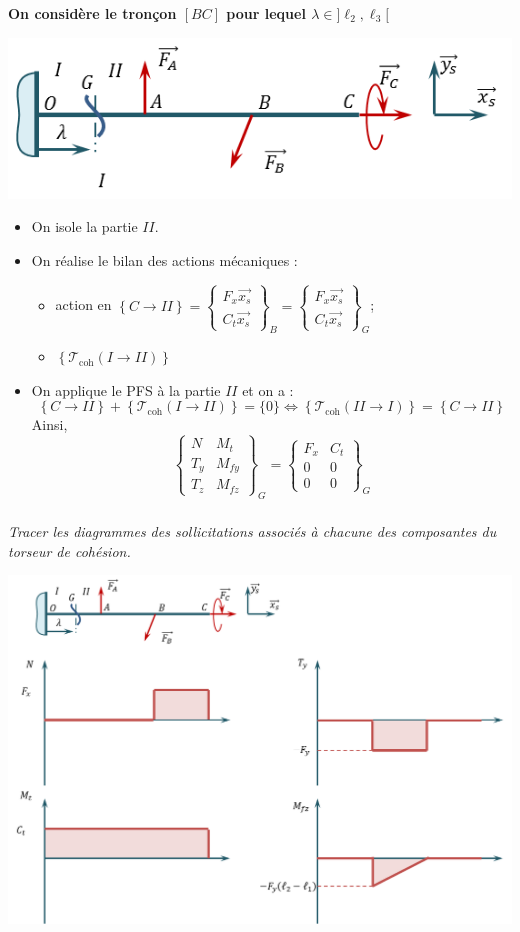 \documentclass[10pt,fleqn]{article} %
\begin{document}
\begin{multicols}{2}
\textbf{On considère le tronçon $[BC]$ pour lequel $\lambda \in ]\ell_2,\ell_3[$}
\begin{center}
\includegraphics[width=.5\linewidth]{images/corr_01}
\end{center}
\begin{itemize}
\item On isole la partie $II$. 
\item On réalise le bilan des actions mécaniques : 
\begin{itemize}
\item action en $\left\{ C \rightarrow II \right\}= \begin{Bmatrix} F_x\overrightarrow{x_s}\\
C_t\overrightarrow{x_s}\end{Bmatrix}_B= \begin{Bmatrix} F_x\overrightarrow{x_s}\\
C_t\overrightarrow{x_s}\end{Bmatrix}_G$;
\item $\left\{ \mathcal{T}_{\text{coh}} \left(I \rightarrow II\right) \right\}$
\end{itemize}
\item On applique le PFS à la partie $II$ et on a : 
$$
\left\{ C\rightarrow II \right\}
+\left\{ \mathcal{T}_{\text{coh}} \left(I \rightarrow II\right) \right\} = \{0\}
\Leftrightarrow
\left\{ \mathcal{T}_{\text{coh}} \left(II \rightarrow I\right) \right\}  =  \left\{ C\rightarrow II \right\}
$$ 
Ainsi, 
$$
\begin{Bmatrix} 
N & M_t \\
T_y & M_{fy} \\
T_z & M_{fz} 
\end{Bmatrix}_G
=
\begin{Bmatrix} 
F_x& C_t \\
0& 0 \\
0 &  0
\end{Bmatrix}_G
$$
\end{itemize}


\subparagraph{}\textit{Tracer les diagrammes des sollicitations associés à chacune des composantes du torseur de cohésion.}
\begin{center}
\includegraphics[width=.5\linewidth]{images/corr_02}
\end{center}


\ifprof
\else
\end{multicols}
\fi
\end{document}
